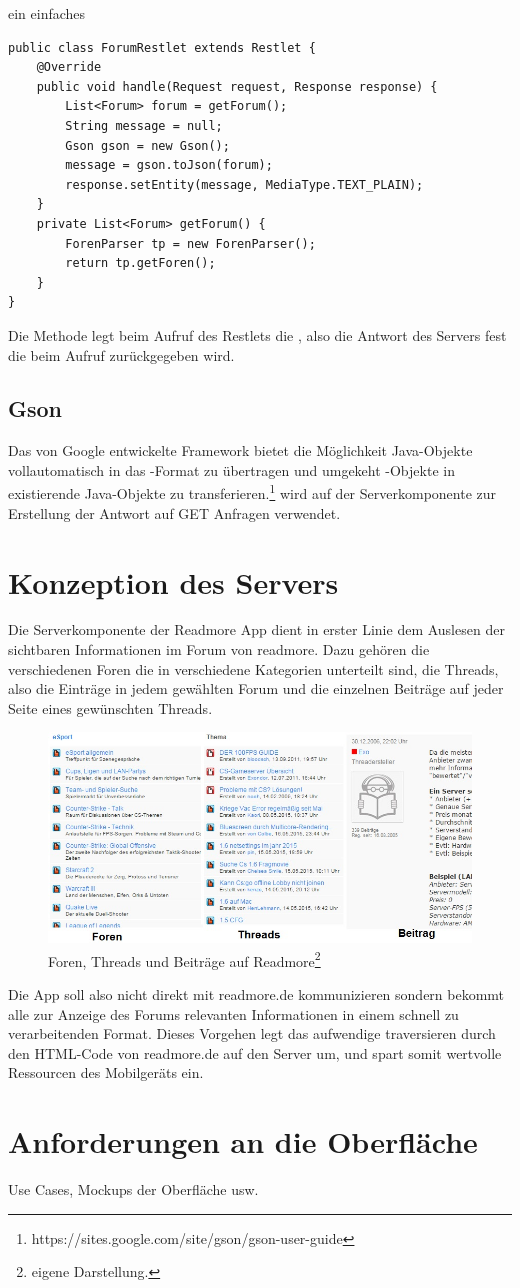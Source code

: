 ein einfaches 
\begin{lstlisting}[caption=Ein einfaches Restlet, label=restlet]
public class ForumRestlet extends Restlet {
	@Override
    public void handle(Request request, Response response) {
		List<Forum> forum = getForum();
        String message = null;
        Gson gson = new Gson();
        message = gson.toJson(forum);
        response.setEntity(message, MediaType.TEXT_PLAIN);
    }
	private List<Forum> getForum() {
		ForenParser tp = new ForenParser();
		return tp.getForen();
	}
}
\end{lstlisting}
Die Methode  legt beim Aufruf
des Restlets die , also die Antwort des Servers fest die
beim Aufruf zurückgegeben wird.
\subsection{Gson}
Das von Google entwickelte Framework  bietet die Möglichkeit
Java-Objekte vollautomatisch in das -Format zu übertragen und
umgekeht -Objekte in existierende Java-Objekte zu
transferieren.\footnote{https://sites.google.com/site/gson/gson-user-guide} 
 wird auf der Serverkomponente zur Erstellung der Antwort auf
GET Anfragen verwendet. 
\section{Konzeption des Servers}
Die Serverkomponente der Readmore App dient in erster Linie dem Auslesen der
sichtbaren Informationen im Forum von readmore. Dazu gehören die verschiedenen
Foren die in verschiedene Kategorien unterteilt sind, die Threads, also die
Einträge in jedem gewählten Forum und die einzelnen Beiträge auf jeder Seite
eines gewünschten Threads. 
\begin{figure}[!htbp]
\centering
\includegraphics[width=\textwidth]{Bilder/ftb.jpg}
\caption[Foren, Threads und Beiträge auf Readmore]{Foren, Threads und Beiträge auf Readmore\protect\footnote{eigene Darstellung.} }
\label{dminfo}
\end{figure}
Die App soll also nicht direkt mit readmore.de kommunizieren sondern bekommt
alle zur Anzeige des Forums relevanten Informationen in einem schnell zu
verarbeitenden Format. Dieses Vorgehen legt das aufwendige traversieren durch
den HTML-Code von readmore.de auf den Server um, und spart somit wertvolle
Ressourcen des Mobilgeräts ein.
\section{Anforderungen an die Oberfläche}
Use Cases, Mockups der Oberfläche usw.